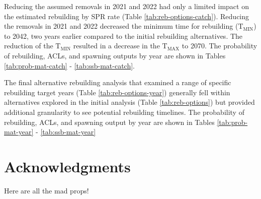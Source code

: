 \documentclass[11pt,
  english,
  a4paper,
]{article}
\begin{document}
\leavevmode\tagmcend\tagstructend\par


Reducing the assumed removals in 2021 and 2022 had only a limited impact on the estimated rebuilding by SPR rate (Table \ref{tab:reb-options-catch}). Reducing the removals in 2021 and 2022 decreased the minimum time for rebuilding ({\(\text{T}_\text{MIN}\)\leavevmode\tagmcend\tagstructend}) to 2042, two years earlier compared to the initial rebuilding alternatives. The reduction of the {\(\text{T}_\text{MIN}\)\leavevmode\tagmcend\tagstructend} resulted in a decrease in the {\(\text{T}_\text{MAX}\)\leavevmode\tagmcend\tagstructend} to 2070. The probability of rebuilding, ACLs, and spawning outputs by year are shown in Tables \ref{tab:prob-mat-catch} - \ref{tab:ssb-mat-catch}.

\leavevmode\tagmcend\tagstructend\par


The final alternative rebuilding analysis that examined a range of specific rebuilding target years (Table \ref{tab:reb-options-year}) generally fell within alternatives explored in the initial analysis (Table \ref{tab:reb-options}) but provided additional granularity to see potential rebuilding timelines. The probability of rebuilding, ACLs, and spawning output by year are shown in Tables \ref{tab:prob-mat-year} - \ref{tab:ssb-mat-year}

\leavevmode\tagmcend\tagstructend\par


\hypertarget{acknowledgments}{%
\section{Acknowledgments}\label{acknowledgments}}

\leavevmode\tagmcend\tagstructend


Here are all the mad props!

\leavevmode\tagmcend\tagstructend\par

\clearpage
\end{document}
